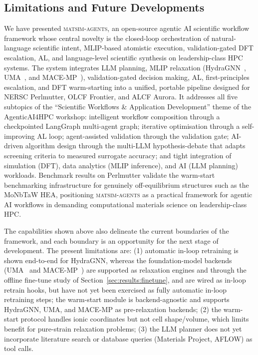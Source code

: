 \documentclass[conference]{IEEEtran}
\def\ac#1{#1}%
\def\acs#1{#1}%
\begin{document}
\subsection{Limitations and Future Developments}
We have presented \textsc{matsim-agents}, an open-source agentic \acs{AI} scientific
workflow framework whose central novelty is the closed-loop orchestration of
natural-language scientific intent, \acs{MLIP}-based atomistic execution,
validation-gated \acs{DFT} escalation, \acs{AL}, and
language-level scientific synthesis on leadership-class \acs{HPC} systems. The system integrates \ac{LLM} planning, \acs{MLIP} relaxation (HydraGNN~\cite{hydragnn},
UMA~\cite{wood2025uma}, and MACE-MP~\cite{batatia2023macemp}), validation-gated decision making, \acs{AL},
first-principles escalation, and \acs{DFT} warm-starting into a unified, portable
pipeline designed for \acs{NERSC} Perlmutter, \acs{OLCF} Frontier, and \acs{ALCF} Aurora. It
addresses all five subtopics of the ``Scientific Workflows \& Application
Development'' theme of the AgenticAI4HPC workshop: intelligent workflow
composition through a checkpointed LangGraph multi-agent graph; iterative
optimisation through a self-improving \acs{AL} loop; agent-assisted
validation through the validation gate; \acs{AI}-driven algorithm design through the
multi-\acs{LLM} hypothesis-debate that adapts screening criteria to measured
surrogate accuracy; and tight integration of simulation (\acs{DFT}),
data analytics (\acs{MLIP} inference), and \acs{AI} (\acs{LLM} planning) workloads.
Benchmark results on Perlmutter validate the warm-start benchmarking infrastructure for
genuinely off-equilibrium structures such as the MoNbTaW \acs{HEA}, positioning
\textsc{matsim-agents} as a practical framework for agentic \acs{AI} workflows in
demanding computational materials science on leadership-class \acs{HPC}.

The capabilities shown above also delineate the current boundaries of the
framework, and each boundary is an opportunity for the next stage of development.
The present limitations are: (1) automatic in-loop retraining is shown
end-to-end for HydraGNN, whereas the foundation-model backends
(UMA~\cite{wood2025uma} and MACE-MP~\cite{batatia2023macemp}) are supported as
relaxation engines and through the offline fine-tune study of
Section~\ref{sec:results:finetune}, and are wired as in-loop retrain hooks, but
have not yet been exercised as fully automatic in-loop retraining steps; the
warm-start module is backend-agnostic and supports HydraGNN, UMA, and MACE-MP as
pre-relaxation backends; (2) the warm-start protocol handles ionic coordinates but not cell
shape/volume, which limits benefit for pure-strain relaxation problems; (3) the
\acs{LLM} planner does not yet incorporate literature search or database queries
(Materials Project, AFLOW) as tool calls.
\end{document}
